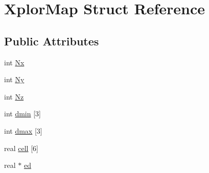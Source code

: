 \hypertarget{structXplorMap}{\section{\-Xplor\-Map \-Struct \-Reference}
\label{structXplorMap}
}
\subsection*{\-Public \-Attributes}
\begin{DoxyCompactItemize}
\item 
int \hyperlink{structXplorMap_a4b03957f675c24cec49bdb5df65f046b}{\-Nx}
\item 
int \hyperlink{structXplorMap_ad5098bc70c377d0cc387cb7b894337e5}{\-Ny}
\item 
int \hyperlink{structXplorMap_aa4902c553999c706302a6c250933d745}{\-Nz}
\item 
int \hyperlink{structXplorMap_aff26faac26bfb8d72363e95503d8cae3}{dmin} \mbox{[}3\mbox{]}
\item 
int \hyperlink{structXplorMap_aafc111087d5d94db0bf38dbb7d436c8a}{dmax} \mbox{[}3\mbox{]}
\item 
real \hyperlink{structXplorMap_a29f13ed5853fe553b8c5be57712e0b5c}{cell} \mbox{[}6\mbox{]}
\item 
real $\ast$ \hyperlink{structXplorMap_a3d8eea31f1ca7c8a1f3a1f6d1d0651d8}{ed}
\end{DoxyCompactItemize}


